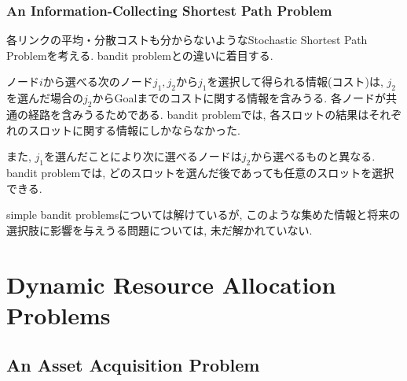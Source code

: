 \documentclass[11pt]{jsbook}
\begin{document}
\subsection{An Information-Collecting Shortest Path Problem}
各リンクの平均・分散コストも分からないようなStochastic Shortest Path Problemを考える.
bandit problemとの違いに着目する.

ノード$i$から選べる次のノード$j_1,j_2$から$j_1$を選択して得られる情報(コスト)は,
$j_2$を選んだ場合の$j_2$からGoalまでのコストに関する情報を含みうる.
各ノードが共通の経路を含みうるためである.
bandit problemでは, 各スロットの結果はそれぞれのスロットに関する情報にしかならなかった.

また, $j_1$を選んだことにより次に選べるノードは$j_2$から選べるものと異なる.
bandit problemでは, どのスロットを選んだ後であっても任意のスロットを選択できる.

simple bandit problemsについては解けているが,
このような集めた情報と将来の選択肢に影響を与えうる問題については, 未だ解かれていない.

\chapter{Dynamic Resource Allocation Problems}
\section{An Asset Acquisition Problem}
\end{document}
